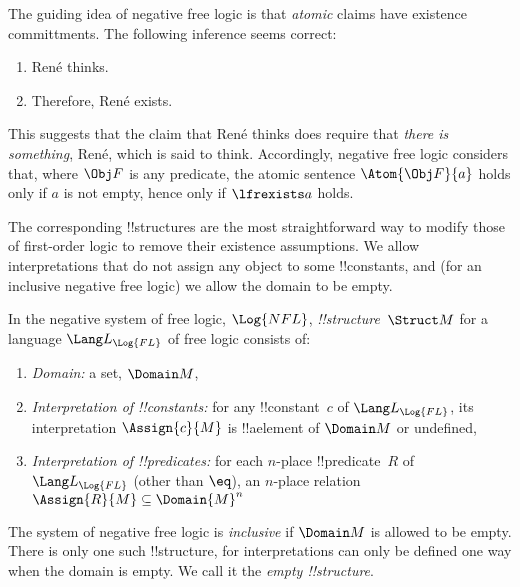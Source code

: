 \documentclass[../../../include/open-logic-section]{subfiles}
\begin{document}


The guiding idea of negative free logic is that \emph{atomic} claims
have existence committments. The following inference seems correct:

\begin{enumerate}
  \item René thinks.
  \item Therefore, René exists.
\end{enumerate}

This suggests that the claim that René thinks does require that \emph{there is 
something}, René, which is said to think.  Accordingly, negative free logic 
considers that, where $\Obj F$ is any predicate, the atomic sentence
 $\Atom{\Obj F}{a}$ holds only if $a$ is not empty, 
 hence only if $\lfrexists a$ holds. 

\begin{explain}
The corresponding !!{structure}s are the most straightforward way to 
modify those of first-order logic to remove their existence assumptions.
We allow interpretations that do not assign any object to some !!{constant}s,
and (for an inclusive negative free logic) we allow the domain to be empty.
\end{explain}

\begin{defn}[!!^{structure}s]
In the negative system of free logic, $\Log{NFL}$,
 \emph{!!{structure}}~$\Struct M$ for a language
$\Lang L_{\Log{FL}}$ of free logic consists of:
\begin{enumerate}
\item \emph{Domain:} a set, $\Domain M$,
\item \emph{Interpretation of !!{constant}s:} for any !!{constant}~$c$ of
  $\Lang L_{\Log{FL}}$, its interpretation $\Assign{c}{M}$ is !!a{element} of 
  $\Domain M$ or undefined,
\item \emph{Interpretation of !!{predicate}s:} for each $n$-place
  !!{predicate}~$R$ of $\Lang L_{\Log{FL}}$ (other than $\eq$), an $n$-place
  relation $\Assign{R}{M} \subseteq \Domain{M}^n$
\end{enumerate}
The system of negative free logic is \emph{inclusive} if $\Domain M$ is
allowed to be empty. There is only one such !!{structure}, for interpretations
can only be defined one way when the domain is empty. We call it the 
\emph{empty !!{structure}}.
\end{defn}
\end{document}
